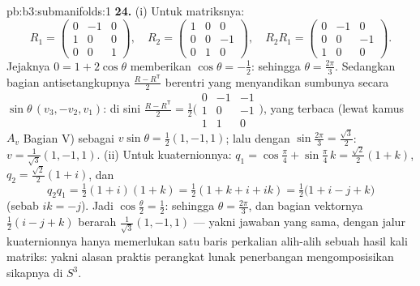 \begin{solution}{pb:b3:submanifolds:1}
\textbf{24.} (i) Untuk matriksnya:
\[
R_1 = \begin{pmatrix} 0 & -1 & 0\\ 1 & 0 & 0\\ 0 & 0 & 1
\end{pmatrix},
\quad
R_2 = \begin{pmatrix} 1 & 0 & 0\\ 0 & 0 & -1\\ 0 & 1 & 0
\end{pmatrix},
\quad
R_2R_1 = \begin{pmatrix} 0 & -1 & 0\\ 0 & 0 & -1\\ 1 & 0 &
0\end{pmatrix}.
\]
Jejaknya $0 = 1 + 2\cos\theta$ memberikan $\cos\theta = -\frac12$:
sehingga $\theta = \frac{2\pi}3$. Sedangkan bagian antisetangkupnya $\frac{R -
R^{\mathsf T}}2$ berentri yang menyandikan sumbunya secara
$\sin\theta\,(v_3, -v_2, v_1)$: di sini $\frac{R - R^{\mathsf T}}2 =
\frac12\bigl(\begin{smallmatrix}0 & -1 & -1\\ 1 & 0 & -1\\ 1
& 1 & 0\end{smallmatrix}\bigr)$, yang terbaca (lewat kamus $A_v$
Bagian V) sebagai $v\sin\theta = \frac12(1, -1, 1)$; lalu dengan
$\sin\frac{2\pi}3 = \frac{\sqrt3}2$: $v = \frac1{\sqrt3}(1,
-1, 1)$.
(ii) Untuk kuaternionnya: $q_1 = \cos\frac\pi4 + \sin\frac\pi4\,k =
\frac{\sqrt2}2(1 + k)$, $q_2 = \frac{\sqrt2}2(1 + i)$, dan
\[
q_2q_1 = \tfrac12(1 + i)(1 + k) = \tfrac12(1 + k + i + ik)
= \tfrac12\bigl(1 + i - j + k\bigr)
\]
(sebab $ik = -j$). Jadi $\cos\frac\theta2 = \frac12$: sehingga $\theta =
\frac{2\pi}3$, dan bagian vektornya $\frac12(i - j + k)$ berarah
$\frac1{\sqrt3}(1, -1, 1)$ --- yakni jawaban yang sama,
dengan jalur kuaternionnya hanya memerlukan satu baris
perkalian alih-alih sebuah hasil kali matriks: yakni alasan praktis
perangkat lunak penerbangan mengomposisikan sikapnya di $S^3$.


\end{solution}
